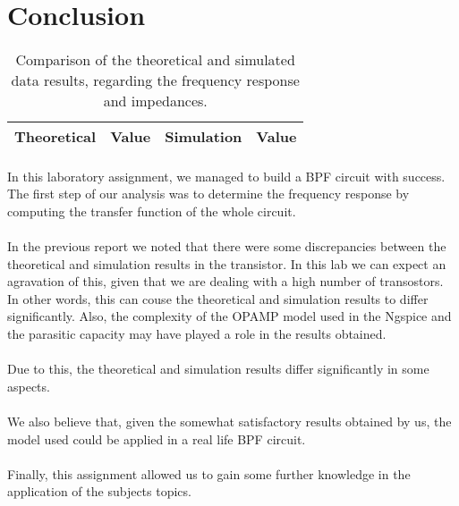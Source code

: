 \section{Conclusion}
\label{sec:conclusion}
\par
\begin{table}[!h]
  \centering
  \begin{tabular}{c c c c}
    \hline    
    {\bf Theoretical} & {\bf Value} & {\bf Simulation} & {\bf Value}\\ \hline
     
  \end{tabular}
  \caption{Comparison of the theoretical and simulated data results, regarding the frequency response and impedances.}
  \label{tab:comp}
\end{table}

\paragraph{} In this laboratory assignment, we managed to build a BPF circuit with success. The first step of our analysis was to determine the frequency response by computing
 the transfer function of the whole circuit.

\paragraph{} In the previous report we noted that there were some discrepancies between the theoretical and simulation results in the transistor. In this lab we can expect an agravation of this, given that we are dealing
with a high number of transostors. In other words, this can couse the theoretical and simulation results to differ significantly. Also, the complexity of the OPAMP model used in the Ngspice and the parasitic 
capacity may have played a role in the results obtained.

\paragraph{} Due to this, the theoretical and simulation results differ significantly in some aspects. 

\paragraph{} We also believe that, given the somewhat satisfactory results obtained by us, the model used could be applied in a real life BPF circuit.

\paragraph{} Finally, this assignment allowed us to gain some further knowledge in the application of the subjects topics.







